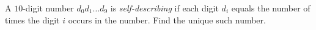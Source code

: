 A $10$-digit number $d_0d_1\dots d_9$ is \emph{self-describing} if each digit $d_i$ equals the number of times the digit $i$ occurs in the number. Find the unique such number.

